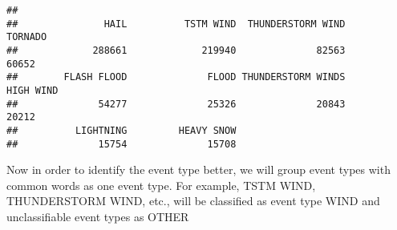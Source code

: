 \documentclass[
]{article}
\newenvironment{Shaded}{\begin{snugshade}}{\end{snugshade}}
\newcommand{\CommentTok}[1]{\textcolor[rgb]{0.56,0.35,0.01}{\textit{#1}}}
\newcommand{\NormalTok}[1]{#1}
\newcommand{\OperatorTok}[1]{\textcolor[rgb]{0.81,0.36,0.00}{\textbf{#1}}}
\newcommand{\StringTok}[1]{\textcolor[rgb]{0.31,0.60,0.02}{#1}}
\begin{document}
\begin{verbatim}
## 
##               HAIL          TSTM WIND  THUNDERSTORM WIND            TORNADO 
##             288661             219940              82563              60652 
##        FLASH FLOOD              FLOOD THUNDERSTORM WINDS          HIGH WIND 
##              54277              25326              20843              20212 
##          LIGHTNING         HEAVY SNOW 
##              15754              15708
\end{verbatim}

Now in order to identify the event type better, we will group event
types with common words as one event type. For example, TSTM WIND,
THUNDERSTORM WIND, etc., will be classified as event type WIND and
unclassifiable event types as OTHER

\begin{Shaded}
\end{Shaded}
\end{document}
